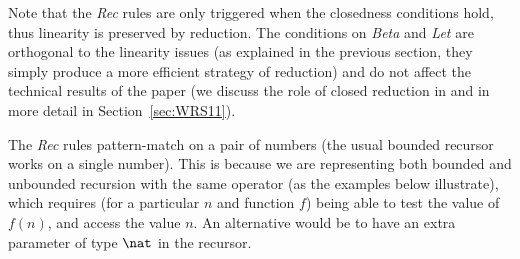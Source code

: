 \documentclass{article}
\begin{document}
Note that the \emph{Rec} rules are only triggered when the closedness conditions
hold, thus linearity is preserved by reduction.  The
conditions on \emph{Beta} and \emph{Let} are orthogonal to the
linearity issues (as explained in the previous section, they simply
produce a more efficient strategy of reduction) and  do not
affect the technical results of the paper (we discuss the role of closed reduction in \LLCI and \LLCIrec in more detail in Section~\ref{sec:WRS11}).

The \emph{Rec} rules pattern-match on a pair of numbers (the usual
bounded recursor works on a single number). This is because we are
representing both bounded and unbounded recursion with the same
operator (as the examples below illustrate), which requires (for a
particular $n$ and function $f$) being able to test the value of
$f(n)$, and access the value $n$.  An alternative would be to have an
extra parameter of type $\nat$ in the recursor.
\end{document}
